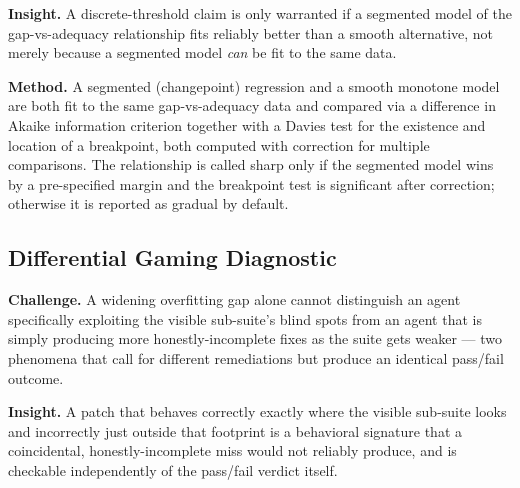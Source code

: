 \documentclass[11pt]{article}
\begin{document}
\textbf{Insight.} A discrete-threshold claim is only warranted if a segmented model of the gap-vs-adequacy relationship fits reliably better than a smooth alternative, not merely because a segmented model \emph{can} be fit to the same data.

\textbf{Method.} A segmented (changepoint) regression and a smooth monotone model are both fit to the same gap-vs-adequacy data and compared via a difference in Akaike information criterion together with a Davies test for the existence and location of a breakpoint, both computed with correction for multiple comparisons. The relationship is called sharp only if the segmented model wins by a pre-specified margin and the breakpoint test is significant after correction; otherwise it is reported as gradual by default.

\subsection{Differential Gaming Diagnostic}
\textbf{Challenge.} A widening overfitting gap alone cannot distinguish an agent specifically exploiting the visible sub-suite's blind spots from an agent that is simply producing more honestly-incomplete fixes as the suite gets weaker --- two phenomena that call for different remediations but produce an identical pass/fail outcome.

\textbf{Insight.} A patch that behaves correctly exactly where the visible sub-suite looks and incorrectly just outside that footprint is a behavioral signature that a coincidental, honestly-incomplete miss would not reliably produce, and is checkable independently of the pass/fail verdict itself.
\end{document}
